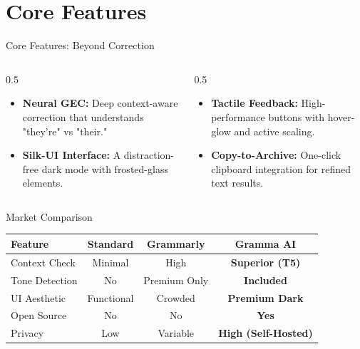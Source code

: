 \documentclass{beamer}
\begin{document}
\section{Core Features}
\begin{frame}{Core Features: Beyond Correction}
    \begin{columns}
        \begin{column}{0.5\textwidth}
            \begin{itemize}
                \item \textbf{Neural GEC:} Deep context-aware correction that understands "they're" vs "their."
                \item \textbf{Silk-UI Interface:} A distraction-free dark mode with frosted-glass elements.
            \end{itemize}
        \end{column}
        \begin{column}{0.5\textwidth}
            \begin{itemize}
                \item \textbf{Tactile Feedback:} High-performance buttons with hover-glow and active scaling.
                \item \textbf{Copy-to-Archive:} One-click clipboard integration for refined text results.
            \end{itemize}
        \end{column}
    \end{columns}
\end{frame}

\begin{frame}{Market Comparison}
    \centering
    \begin{tabular}{lccc}
        \toprule
        \textbf{Feature} & \textbf{Standard} & \textbf{Grammarly} & \textbf{Gramma AI} \\
        \midrule
        Context Check & Minimal & High & \textbf{Superior (T5)} \\
        Tone Detection & No & Premium Only & \textbf{Included} \\
        UI Aesthetic & Functional & Crowded & \textbf{Premium Dark} \\
        Open Source & No & No & \textbf{Yes} \\
        Privacy & Low & Variable & \textbf{High (Self-Hosted)} \\
        \bottomrule
    \end{tabular}
\end{frame}
\end{document}
